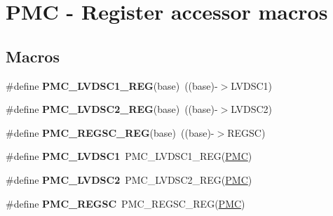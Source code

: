 \hypertarget{group__PMC__Register__Accessor__Macros}{}\section{P\+MC -\/ Register accessor macros}
\label{group__PMC__Register__Accessor__Macros}
\subsection*{Macros}
\begin{DoxyCompactItemize}
\item 
\#define {\bfseries P\+M\+C\+\_\+\+L\+V\+D\+S\+C1\+\_\+\+R\+EG}(base)~((base)-\/$>$L\+V\+D\+S\+C1)\hypertarget{group__PMC__Register__Accessor__Macros_gaf6a5650ee275b48943fd2a5f0845be4e}{}\label{group__PMC__Register__Accessor__Macros_gaf6a5650ee275b48943fd2a5f0845be4e}

\item 
\#define {\bfseries P\+M\+C\+\_\+\+L\+V\+D\+S\+C2\+\_\+\+R\+EG}(base)~((base)-\/$>$L\+V\+D\+S\+C2)\hypertarget{group__PMC__Register__Accessor__Macros_ga691e6102ace21a6b54fabd256c5f0d7b}{}\label{group__PMC__Register__Accessor__Macros_ga691e6102ace21a6b54fabd256c5f0d7b}

\item 
\#define {\bfseries P\+M\+C\+\_\+\+R\+E\+G\+S\+C\+\_\+\+R\+EG}(base)~((base)-\/$>$R\+E\+G\+SC)\hypertarget{group__PMC__Register__Accessor__Macros_ga56808559a3b60498b6604642202faaea}{}\label{group__PMC__Register__Accessor__Macros_ga56808559a3b60498b6604642202faaea}

\item 
\#define {\bfseries P\+M\+C\+\_\+\+L\+V\+D\+S\+C1}~P\+M\+C\+\_\+\+L\+V\+D\+S\+C1\+\_\+\+R\+EG(\hyperlink{group__PMC__Peripheral__Access__Layer_ga979c6d379c67bc2f3e8eb6efcb509f69}{P\+MC})\hypertarget{group__PMC__Register__Accessor__Macros_gae9e90b7b2d3c4f5e0950d074fecb2798}{}\label{group__PMC__Register__Accessor__Macros_gae9e90b7b2d3c4f5e0950d074fecb2798}

\item 
\#define {\bfseries P\+M\+C\+\_\+\+L\+V\+D\+S\+C2}~P\+M\+C\+\_\+\+L\+V\+D\+S\+C2\+\_\+\+R\+EG(\hyperlink{group__PMC__Peripheral__Access__Layer_ga979c6d379c67bc2f3e8eb6efcb509f69}{P\+MC})\hypertarget{group__PMC__Register__Accessor__Macros_ga921b48d20e5bc7e7353ac2f59c8135ba}{}\label{group__PMC__Register__Accessor__Macros_ga921b48d20e5bc7e7353ac2f59c8135ba}

\item 
\#define {\bfseries P\+M\+C\+\_\+\+R\+E\+G\+SC}~P\+M\+C\+\_\+\+R\+E\+G\+S\+C\+\_\+\+R\+EG(\hyperlink{group__PMC__Peripheral__Access__Layer_ga979c6d379c67bc2f3e8eb6efcb509f69}{P\+MC})\hypertarget{group__PMC__Register__Accessor__Macros_gad80edb8f69da1769b7367108d8c4f9be}{}\label{group__PMC__Register__Accessor__Macros_gad80edb8f69da1769b7367108d8c4f9be}


\end{DoxyCompactItemize}
